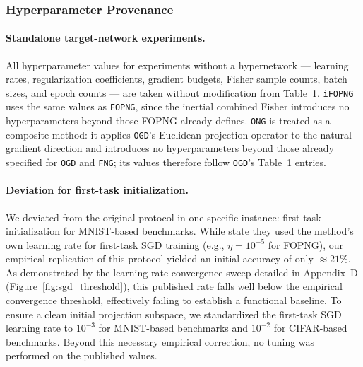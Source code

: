\subsubsection{Hyperparameter Provenance}
\label{sec:hparam_provenance}

\paragraph{Standalone target-network experiments.}
All hyperparameter values for experiments without a hypernetwork ---
learning rates, regularization coefficients, gradient budgets, Fisher
sample counts, batch sizes, and epoch counts --- are taken without
modification from \citet{garg_fisher-orthogonal_2026} Table~1.
\texttt{iFOPNG} uses the same values as \texttt{FOPNG}, since the inertial
combined Fisher introduces no hyperparameters beyond those FOPNG already
defines.
\texttt{ONG} \citep{yadav_ong_2025} is treated as a composite
method: it applies \texttt{OGD}'s Euclidean projection operator to the
natural gradient direction and introduces no hyperparameters beyond those
already specified for \texttt{OGD} and \texttt{FNG}; its values therefore
follow \texttt{OGD}'s Table~1 entries.

\paragraph{Deviation for first-task initialization.}
We deviated from the original protocol in one specific instance: first-task 
initialization for MNIST-based benchmarks. While \citet{garg_fisher-orthogonal_2026} 
state they used the method's own learning rate for first-task SGD training 
(e.g., $\eta = 10^{-5}$ for FOPNG), our empirical replication of this protocol 
yielded an initial accuracy of only $\approx 21\%$. As demonstrated by the 
learning rate convergence sweep detailed in Appendix~D (Figure~\ref{fig:sgd_threshold}), 
this published rate falls well below the empirical convergence threshold, 
effectively failing to establish a functional baseline. To ensure a clean initial 
projection subspace, we standardized the first-task SGD learning rate to $10^{-3}$ 
for MNIST-based benchmarks and $10^{-2}$ for CIFAR-based benchmarks. 
Beyond this necessary empirical correction, no tuning was performed on the published values.


